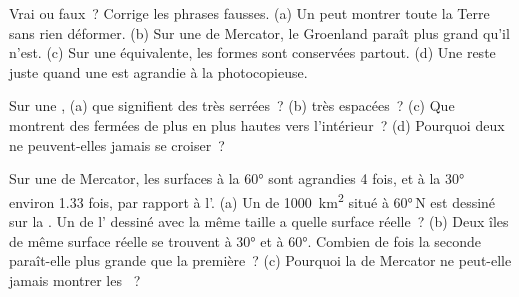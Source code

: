 \begin{exercise}[$\star$]\label{exo:g9:maps-of-the-earth:3}
Vrai ou faux~? Corrige les phrases fausses. (a) Un  peut
montrer toute la Terre sans rien déformer. (b) Sur une  de Mercator,
le Groenland paraît plus grand qu'il n'est. (c) Sur une  équivalente,
les formes sont conservées partout. (d) Une  reste juste
quand une  est agrandie à la photocopieuse.
\end{exercise}

\begin{exercise}[$\star$]\label{exo:g9:maps-of-the-earth:4}
Sur une , (a) que signifient des  très
serrées~? (b) très espacées~? (c) Que montrent des 
fermées de plus en plus hautes vers l'intérieur~? (d) Pourquoi deux
 ne peuvent-elles jamais se croiser~?
\end{exercise}

\begin{exercise}[$\star\star$]\label{exo:g9:maps-of-the-earth:5}
Sur une  de Mercator, les surfaces à la  \ang{60} sont
agrandies 4 fois, et à la  \ang{30} environ 1.33 fois, par rapport
à l'. (a) Un  de \qty{1000}{km^2} situé à \ang{60}\,N est dessiné
sur la . Un  de l' dessiné avec la même taille a quelle
surface réelle~? (b) Deux îles de même surface réelle se trouvent à \ang{30}
et à \ang{60}. Combien de fois la seconde paraît-elle plus grande que la
première~? (c) Pourquoi la  de Mercator ne peut-elle jamais montrer
les ~?
\end{exercise}

